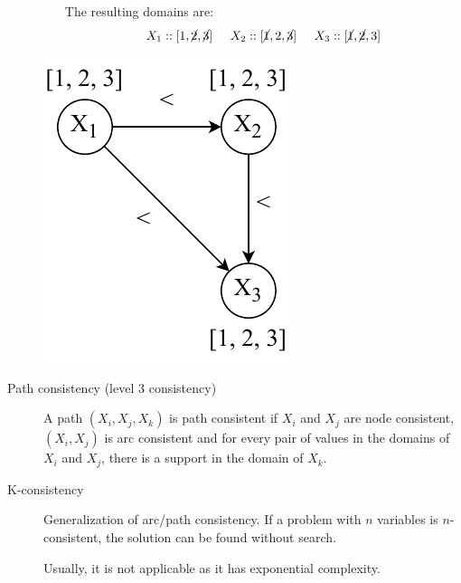 \begin{description}
\begin{example}
\begin{minipage}{0.7\textwidth}
\begin{enumerate}
                        The resulting domains are:
                        \[ X_1 :: [1, \cancel{2}, \cancel{3}] \hspace{0.5cm} X_2 :: [\cancel{1}, 2, \cancel{3}] \hspace{0.5cm} X_3 :: [\cancel{1}, \cancel{2}, 3] \]
                \end{enumerate}
            \end{minipage}
            \begin{minipage}{0.20\textwidth}
                \includegraphics[width=\linewidth]{img/_constraint_graph.pdf}
            \end{minipage}
        \end{example}

    \item[Path consistency (level 3 consistency)] 
        A path $(X_i, X_j, X_k)$ is path consistent if $X_i$ and $X_j$ are node consistent, $(X_i, X_j)$ is arc consistent and
        for every pair of values in the domains of $X_i$ and $X_j$, there is a support in the domain of $X_k$.

    \item[K-consistency] 
        Generalization of arc/path consistency.
        If a problem with $n$ variables is $n$-consistent, the solution can be found without search.

        Usually, it is not applicable as it has exponential complexity.
\end{description}